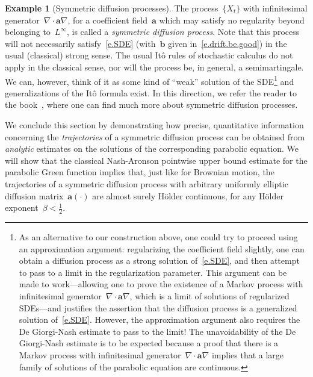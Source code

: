 \documentclass[11pt,twoside]{article} %
\numberwithin{equation}{section}
\theoremstyle{definition}
\newtheorem{example}[theorem]{Example}
\renewcommand{\b}{\ensuremath{\mathbf{b}}}
\renewcommand{\a}{\mathbf{a}}
\begin{document}
\begin{example}[Symmetric diffusion processes]
\smallskip

The process~$\{X_t\}$ with infinitesimal generator~$\nabla\cdot\a\nabla$, for a coefficient field~$\a$ which may satisfy no regularity beyond belonging to~$L^\infty$, is called a \emph{symmetric diffusion process}.
Note that this process will not necessarily satisfy~\eqref{e.SDE} (with~$\b$ given in~\eqref{e.drift.be.good}) in the usual (classical) strong sense. 
The usual It\^o rules of stochastic calculus do not apply in the classical sense, nor will the process be, in general, a semimartingale. 
We can, however, think of it as some kind of ``weak'' solution of the SDE\footnote{As an alternative to our construction above, one could try to proceed using an approximation argument: regularizing the coefficient field slightly, one can obtain a diffusion process as a strong solution of~\eqref{e.SDE}, and then attempt to pass to a limit in the regularization parameter. This argument can be made to work---allowing one to prove the existence of a Markov process with infinitesimal generator~$\nabla \cdot\a\nabla$, which is a limit of solutions of regularized SDEs---and justifies the assertion that the diffusion process is a generalized solution of~\eqref{e.SDE}. However, the approximation argument also requires the De Giorgi-Nash estimate to pass to the limit! The unavoidability of the De Giorgi-Nash estimate is to be expected because a proof that there is a Markov process with infinitesimal generator~$\nabla \cdot \a\nabla$ implies that a large family of solutions of the parabolic equation are continuous.}  
and generalizations of the It\^o formula exist. In this direction, we refer the reader to the book~\cite{Fuku}, where one can find much more about symmetric diffusion processes.
\end{example}



We conclude this section by demonstrating how precise, quantitative information concerning the \emph{trajectories} of a symmetric diffusion process can be obtained from \emph{analytic} estimates on the solutions of the corresponding parabolic equation. We will show that the classical Nash-Aronson pointwise upper bound estimate for the parabolic Green function implies that, just like for Brownian motion, the trajectories of a symmetric diffusion process with arbitrary uniformly elliptic diffusion matrix~$\a(\cdot)$ are almost surely H\"older continuous, for any H\"older exponent~$\beta<\frac12$. 

\smallskip
\end{document}
